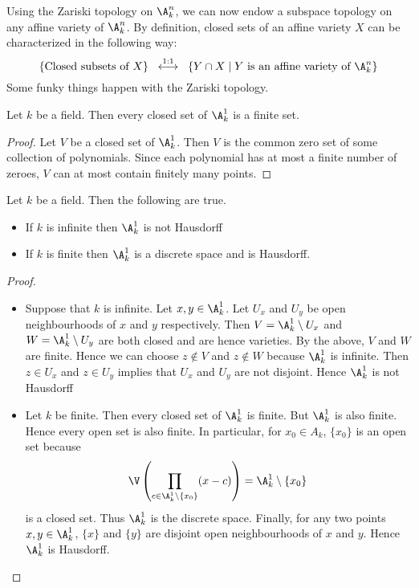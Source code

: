 \documentclass[a4paper]{article}
\begin{document}
Using the Zariski topology on $\A_k^n$, we can now endow a subspace topology on any affine variety of $\A_k^n$. By definition, closed sets of an affine variety $X$ can be characterized in the following way: $$\left\{\text{Closed subsets of }X\right\}\;\;\overset{1:1}{\longleftrightarrow}\;\;\left\{Y\cap X\;|\; Y\text{ is an affine variety of }\A_k^n\right\}$$ Some funky things happen with the Zariski topology. 

\begin{lmm}{}{} Let $k$ be a field. Then every closed set of $\A_k^1$ is a finite set. \tcbline
\begin{proof}
Let $V$ be a closed set of $\A_k^1$. Then $V$ is the common zero set of some collection of polynomials. Since each polynomial has at most a finite number of zeroes, $V$ can at most contain finitely many points. 
\end{proof}
\end{lmm}

\begin{eg}{}{} Let $k$ be a field. Then the following are true. 
\begin{itemize}
\item If $k$ is infinite then $\A_k^1$ is not Hausdorff
\item If $k$ is finite then $\A_k^1$ is a discrete space and is Hausdorff. 
\end{itemize} \tcbline
\begin{proof}~\\
\begin{itemize}
\item Suppose that $k$ is infinite. Let $x,y\in\A_k^1$. Let $U_x$ and $U_y$ be open neighbourhoods of $x$ and $y$ respectively. Then $V=\A_k^1\setminus U_x$ and $W=\A_k^1\setminus U_y$ are both closed and are hence varieties. By the above, $V$ and $W$ are finite. Hence we can choose $z\notin V$ and $z\notin W$ because $\A_k^1$ is infinite. Then $z\in U_x$ and $z\in U_y$ implies that $U_x$ and $U_y$ are not disjoint. Hence $\A_k^1$ is not Hausdorff
\item Let $k$ be finite. Then every closed set of $\A_k^1$ is finite. But $\A_k^1$ is also finite. Hence every open set is also finite. In particular, for $x_0\in A_k$, $\{x_0\}$ is an open set because $$\V\left(\prod_{c\in\A_k^1\setminus\{x_0\}}(x-c)\right)=\A_k^1\setminus\{x_0\}$$ is a closed set. Thus $\A_k^1$ is the discrete space. Finally, for any two points $x,y\in\A_k^1$, $\{x\}$ and $\{y\}$ are disjoint open neighbourhoods of $x$ and $y$. Hence $\A_k^1$ is Hausdorff. 
\end{itemize}
\end{proof}
\end{eg}
\end{document}
